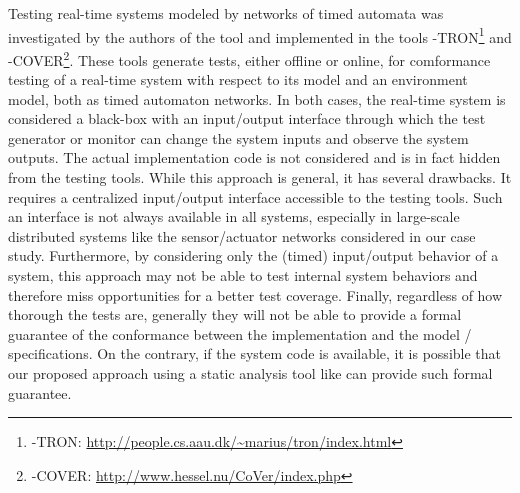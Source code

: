 Testing real-time systems modeled by networks of timed automata was
investigated by the authors of the tool \uppaal
\cite{uppaaltron2008,uppaalcover2007,uppaaltron2005} and implemented
in the tools \uppaal-TRON\footnote{\uppaal-TRON:
  \url{http://people.cs.aau.dk/~marius/tron/index.html}} and
\uppaal-COVER\footnote{\uppaal-COVER:
  \url{http://www.hessel.nu/CoVer/index.php}}.  These tools generate
tests, either offline or online, for comformance testing of a
real-time system with respect to its model and an environment model,
both as timed automaton networks.  In both cases, the real-time system
is considered a black-box with an input/output interface through which
the test generator or monitor can change the system inputs and observe
the system outputs.  The actual implementation code is not considered
and is in fact hidden from the testing tools.  While this approach is
general, it has several drawbacks.  It requires a centralized
input/output interface accessible to the testing tools.  Such an
interface is not always available in all systems, especially in
large-scale distributed systems like the sensor/actuator networks
considered in our case study.  Furthermore, by considering only the
(timed) input/output behavior of a system, this approach may not be
able to test internal system behaviors and therefore miss
opportunities for a better test
coverage.  %
Finally, regardless of how thorough the tests are, generally they will
not be able to provide a formal guarantee of the conformance between
the implementation and the model / specifications.  On the contrary,
if the system code is available, it is possible that our proposed
approach using a static analysis tool like \framac can provide such
formal guarantee.




